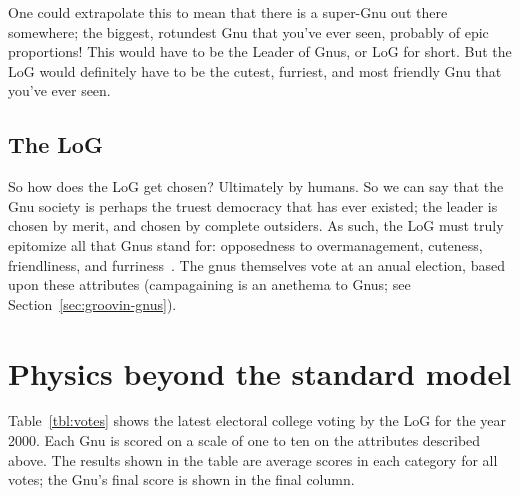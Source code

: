 One could extrapolate this to mean that there is a super-Gnu out there
somewhere; the biggest, rotundest Gnu that you've ever seen, probably
of epic proportions!  This would have to be the Leader of Gnus, or LoG
for short.  But the LoG would definitely have to be the cutest,
furriest, and most friendly Gnu that you've ever seen.

\subsection{The LoG}

So how does the LoG get chosen?  Ultimately by humans.  So we can say
that the Gnu society is perhaps the truest democracy that has ever
existed; the leader is chosen by merit, and chosen by complete
outsiders.  As such, the LoG must truly epitomize all that Gnus stand
for: opposedness to overmanagement, cuteness, friendliness, and
furriness~\citep{gloonson98:_gnuly_discov_gnus}.  The gnus themselves
vote at an anual election, based upon these attributes (campagaining
is an anethema to Gnus; see Section~\ref{sec:groovin-gnus}).

\section{Physics beyond the standard model}
\label{sec:BSM}

Table~\ref{tbl:votes} shows the latest electoral college voting by the
LoG for the year 2000.  Each Gnu is scored on a scale of one to ten on
the attributes described above.  The results shown in the table are
average scores in each category for all votes; the Gnu's final score
is shown in the final column.

%
%

